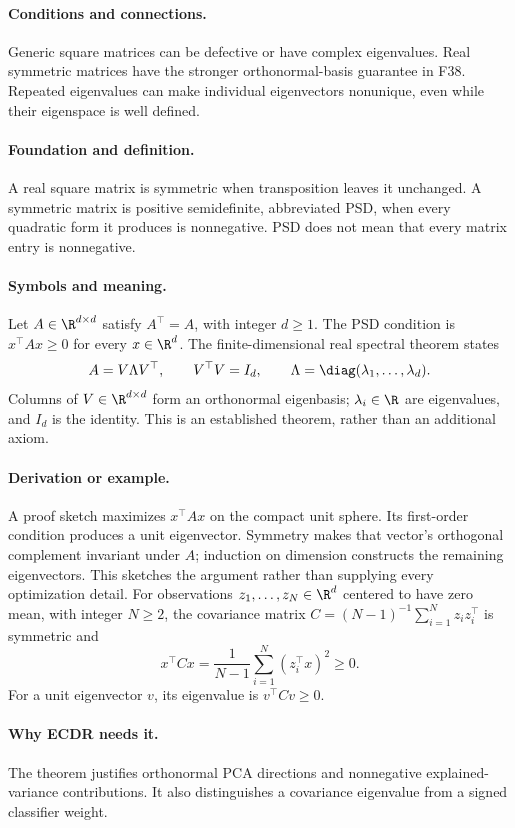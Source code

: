 \paragraph{Conditions and connections.}
Generic square matrices can be defective or have complex eigenvalues.
Real symmetric matrices have the stronger orthonormal-basis guarantee
in F38. Repeated eigenvalues can make individual eigenvectors
nonunique, even while their eigenspace is well defined.

\paragraph{Foundation and definition.}
A real square matrix is symmetric when transposition leaves it
unchanged. A symmetric matrix is positive semidefinite, abbreviated PSD,
when every quadratic form it produces is nonnegative. PSD does not mean
that every matrix entry is nonnegative.
\paragraph{Symbols and meaning.}
Let $A\in\R^{d\times d}$ satisfy $A^\top=A$, with integer
$d\ge1$. The PSD condition is $x^\top Ax\ge0$ for every
$x\in\R^d$. The finite-dimensional real spectral theorem states
\[
 A=V\Lambda V^\top,\qquad V^\top V=I_d,
 \qquad\Lambda=\diag(\lambda_1,\ldots,\lambda_d).
\]
Columns of $V\in\R^{d\times d}$ form an orthonormal eigenbasis;
$\lambda_i\in\R$ are eigenvalues, and $I_d$ is the identity.
This is an established theorem, rather than an additional axiom.
\paragraph{Derivation or example.}
A proof sketch maximizes $x^\top Ax$ on the compact unit sphere.
Its first-order condition produces a unit eigenvector. Symmetry makes
that vector's orthogonal complement invariant under $A$; induction on
dimension constructs the remaining eigenvectors. This sketches the
argument rather than supplying every optimization detail.
For observations $z_1,\ldots,z_N\in\R^d$ centered to have zero
mean, with integer $N\ge2$, the covariance matrix
$C=(N-1)^{-1}\sum_{i=1}^{N}z_i z_i^\top$ is symmetric and
\[
 x^\top Cx=\frac1{N-1}\sum_{i=1}^{N}(z_i^\top x)^2\ge0.
\]
For a unit eigenvector $v$, its eigenvalue is $v^\top Cv\ge0$.
\paragraph{Why ECDR needs it.}
The theorem justifies orthonormal PCA directions and nonnegative
explained-variance contributions. It also distinguishes a covariance
eigenvalue from a signed classifier weight.
